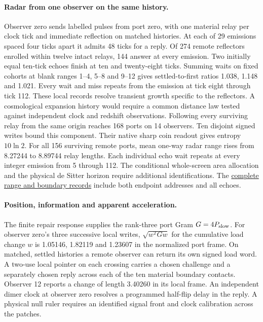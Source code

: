 \documentclass[11pt]{article}
\theoremstyle{remark}
\begin{document}
\paragraph{Radar from one observer on the same history.}
Observer zero sends labelled pulses from port zero, with one material relay
per clock tick and immediate reflection on matched histories. At each of
29 emissions spaced four ticks apart it admits 48 ticks for a reply. Of
274 remote reflectors enrolled within twelve intact relays, 144 answer at
every emission. Two initially equal ten-tick echoes finish at ten and
twenty-eight ticks. Summing waits on fixed cohorts at blank ranges 1--4,
5--8 and 9--12 gives settled-to-first ratios 1.038, 1.148 and 1.021.
Every wait and miss repeats from the emission at tick eight through tick
112. These local records resolve transient growth specific to the
reflectors. A cosmological expansion history would require a common
distance law tested against independent clock and redshift observations.
Following every surviving relay from the same origin reaches 168 ports
on 14 observers. Ten disjoint signed writes bound this component. Their
native sharp coin readout gives entropy $10\ln 2$. For all 156 surviving
remote ports, mean one-way radar range rises from 8.27244 to 8.89744
relay lengths. Each individual echo wait repeats at every integer emission
from 5 through 112. The conditional whole-screen area allocation and the
physical de Sitter horizon require additional identifications. The
\href{https://dovybzrnzxfo1.cloudfront.net/analysis/observer_zero_capacity.json}{complete
range and boundary records} include both endpoint addresses and all echoes.

\paragraph{Position, information and apparent acceleration.}
The finite repair response supplies the rank-three port Gram
$G=4P_{\rm slow}$. For observer zero's three successive local writes,
$\sqrt{w^T G w}$ for the cumulative load change $w$ is 1.05146,
1.82119 and 1.23607 in the normalized port frame. On matched, settled
histories a remote observer can return its own signed load word. A
two-use local pointer on each crossing carries a chosen challenge and a
separately chosen reply across each of the ten material boundary
contacts. Observer 12 reports a change of length 3.40260 in its local
frame. An independent dimer clock at observer zero resolves a programmed
half-flip delay in the reply. A physical null ruler requires an identified
signal front and clock calibration across the patches.
\end{document}

